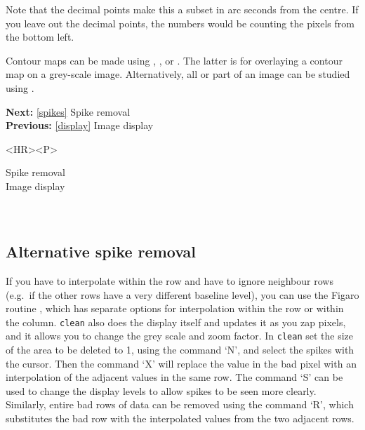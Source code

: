    Note that the decimal points make this a subset in arc seconds from
   the centre. If you leave out the decimal points, the numbers would be
   counting the pixels from the bottom left.

\begin{latexonly}
\begin{center}
\leavevmode\epsfysize=80mm
\end{center}
\end{latexonly}

   Contour maps can be made using
{\tt {}},
{\tt {}},
   or
{\tt {}}.
   The latter is for overlaying a contour map on a grey-scale image.
   Alternatively, all or part of an image can be studied using
{\tt {}}.

\begin{latexonly}
{\bf Next:} \ref{spikes} Spike removal\\
{\bf Previous:} \ref{display} Image display\\
\end{latexonly}

\begin{htmlonly}
\begin{rawhtml} <HR><P> \end{rawhtml}
{\bf {}} Spike removal\\
{\bf {}} Image display\\
{\bf {}}\\
{\bf {}}\\
\end{htmlonly}


\subsection{\label{spikes2}Alternative spike removal}

   If you have to interpolate within the row and have to ignore neighbour
   rows (e.g.\ if the other rows have a very different baseline level),
   you can use the Figaro routine
{\tt {}},
   which has separate options for interpolation within the row or within
   the column. {\tt clean} also does the display itself and updates it
   as you zap pixels, and it allows you to change the grey scale and
   zoom factor. In {\tt clean} set the size of the area to be deleted to
   1, using the command `N', and select the spikes with the cursor. 
   Then the command `X' will replace the value in the bad pixel with an
   interpolation of the adjacent values in the same row. The command `S'
   can be used to change the display levels to allow spikes to be seen
   more clearly. Similarly, entire bad rows of data can be removed using
   the command `R', which substitutes the bad row with the interpolated
   values from the two adjacent rows.

